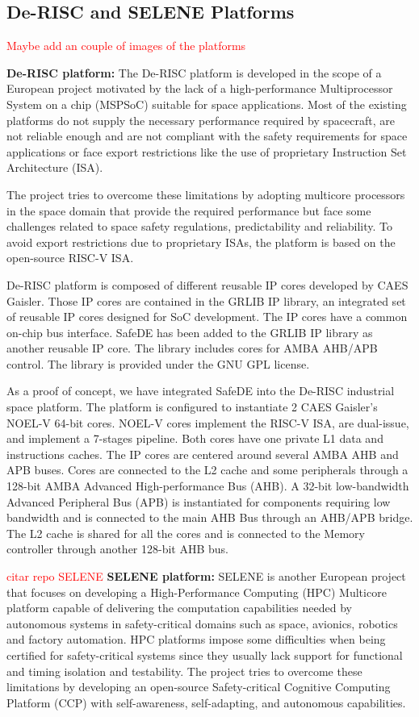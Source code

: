 \subsection{De-RISC and SELENE Platforms}
\textcolor{red}{Maybe add an couple of images of the platforms}


\textbf{De-RISC platform:} The De-RISC platform \cite{gomez2020risc} is developed in the scope of a European project motivated by the lack of a high-performance Multiprocessor System on a chip (MSPSoC) suitable for space applications. Most of the existing platforms do not supply the necessary performance required by spacecraft, are not reliable enough and are not compliant with the safety requirements for space applications or face export restrictions like the use of proprietary Instruction Set Architecture (ISA). 

The project tries to overcome these limitations by adopting multicore processors in the space domain that provide the required performance but face some challenges related to space safety regulations, predictability and reliability. To avoid export restrictions due to proprietary ISAs, the platform is based on the open-source RISC-V ISA. 

De-RISC platform is composed of different reusable IP cores developed by CAES Gaisler. Those IP cores are contained in the GRLIB IP library, an integrated set of reusable IP cores designed for SoC development. The IP cores have a common on-chip bus interface. SafeDE has been added to the GRLIB IP library as another reusable IP core. The library includes cores for AMBA AHB/APB control. The library is provided under the GNU GPL license.

As a proof of concept, we have integrated SafeDE into the De-RISC industrial space platform. The platform is configured to instantiate 2 CAES Gaisler's NOEL-V 64-bit cores. NOEL-V cores implement the RISC-V ISA, are dual-issue, and implement a 7-stages pipeline. Both cores have one private L1 data and instructions caches. The IP cores are centered around several AMBA AHB and APB buses. Cores are connected to the L2 cache and some peripherals through a 128-bit AMBA Advanced High-performance Bus (AHB). A 32-bit low-bandwidth Advanced Peripheral Bus (APB) is instantiated for components requiring low bandwidth and is connected to the main AHB Bus through an AHB/APB bridge. The L2 cache is shared for all the cores and is connected to the Memory controller through another 128-bit AHB bus.


\textcolor{red}{citar repo SELENE}
\textbf{SELENE platform:} SELENE is another European project that focuses on developing a High-Performance Computing (HPC) Multicore platform capable of delivering the computation capabilities needed by autonomous systems in safety-critical domains such as space, avionics, robotics and factory automation. HPC platforms impose some difficulties when being certified for safety-critical systems since they usually lack support for functional and timing isolation and testability. The project tries to overcome these limitations by developing an open-source Safety-critical Cognitive Computing Platform (CCP) with self-awareness, self-adapting, and autonomous capabilities. 

